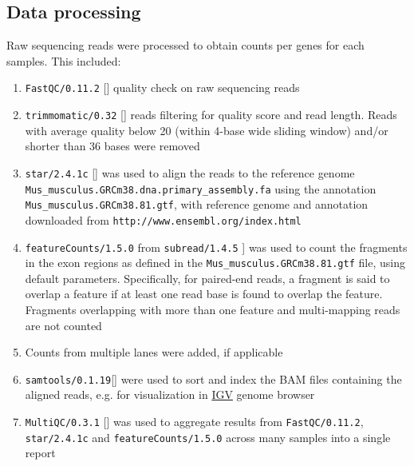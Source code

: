 \documentclass[12pt]{article}
\newcommand{\fastqc}{\texttt{FastQC/0.11.2}}
\newcommand{\trimmomatic}{\texttt{trimmomatic/0.32}}
\renewcommand{\star}{\texttt{star/2.4.1c}}
\newcommand{\featureCounts}{\texttt{featureCounts/1.5.0}}
\newcommand{\subread}{\texttt{subread/1.4.5}}
\newcommand{\samtools}{\texttt{samtools/0.1.19}}
\newcommand{\multiqc}{\texttt{MultiQC/0.3.1}}
\newcommand{\refGenome}{\texttt{Mus\_musculus.GRCm38.\-dna.primary\_assembly.fa}}
\newcommand{\refAnnotation}{\texttt{Mus\_musculus.GRCm38.81.gtf}}
\newcommand{\refSource}{\texttt{http://www.ensembl.org/index.html}}
\begin{document}
\subsection{Data processing}
Raw sequencing reads were processed to obtain counts per genes for each samples. This included: 
\begin{enumerate}
  \item {\fastqc} [\cite{Andrews2010}] quality check on raw sequencing reads
  \item {\trimmomatic} [\cite{Bolger2014}] reads filtering for quality score and read length. Reads with average quality below 20 (within 4-base wide sliding window) and/or shorter than 36 bases were removed
  \item {\star} [\cite{Dobin2013}] was used to align the reads to the reference genome {\refGenome} using the annotation {\refAnnotation}, with reference genome and annotation downloaded from {\refSource}
  \item {\featureCounts} from {\subread} \cite{Liao2013}] was used to count the fragments in the exon regions as defined in the {\refAnnotation} file, using default parameters. Specifically, for paired-end reads, a fragment is said to overlap a feature if at least one read base is found to overlap the feature. Fragments overlapping with more than one feature and multi-mapping reads are not counted
  \item Counts from multiple lanes were added, if applicable
  \item {\samtools}[\cite{Li2009}] were used to sort and index the BAM files containing the aligned reads, e.g. for visualization in \href{https://www.broadinstitute.org/igv/}{IGV} genome browser 
  \item {\multiqc}  [\cite{Ewels2016}] was used to aggregate results from {\fastqc}, {\star} and {\featureCounts} across many samples into a single report
\end{enumerate}
\end{document}
